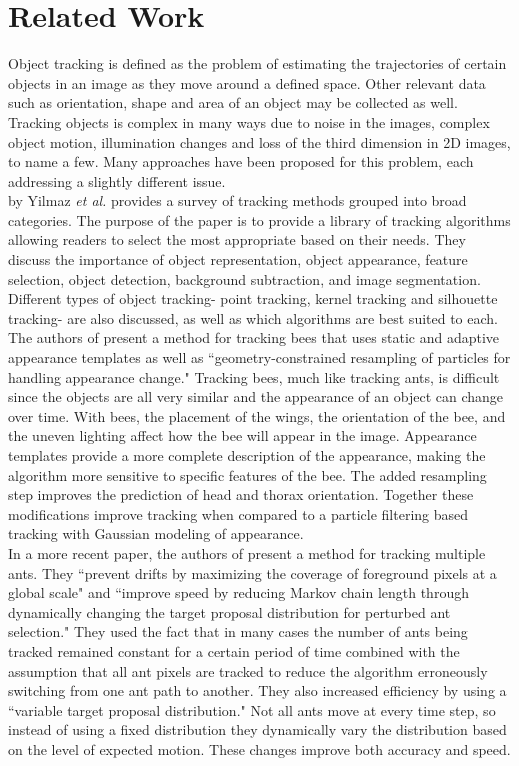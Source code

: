 \documentclass[12pt]{article}
\begin{document}
\section{Related Work}
Object tracking is defined as the problem of estimating the trajectories of certain objects in an image as they move around a defined space. Other relevant data such as orientation, shape and area of an object may be collected as well. Tracking objects is complex in many ways due to noise in the images, complex object motion, illumination changes and loss of the third dimension in 2D images, to name a few. Many approaches have been proposed for this problem, each addressing a slightly different issue.\\
\indent  \cite{Yilmaz06}  by Yilmaz {\it et al.} provides a survey of tracking methods grouped into broad categories. The purpose of the paper is to provide a library of tracking algorithms allowing readers to select the most appropriate based on their needs. They discuss the importance of object representation, object appearance, feature selection, object detection, background subtraction, and image segmentation. Different types of object tracking- point tracking, kernel tracking and silhouette tracking- are also discussed, as well as which algorithms are best suited to each. \\
\indent The authors of \cite{Maitra09} present a method for tracking bees that uses static and adaptive appearance templates as well as ``geometry-constrained resampling of particles for handling appearance change." Tracking bees, much like tracking ants, is difficult since the objects are all very similar and the appearance of an object can change over time. With bees, the placement of the wings, the orientation of the bee, and the uneven lighting affect how the bee will appear in the image. Appearance templates provide a more complete description of the appearance, making the algorithm more sensitive to specific features of the bee. The added resampling step improves the prediction of head and thorax orientation. Together these modifications improve tracking when compared to a particle filtering based tracking with Gaussian modeling of appearance.\\
\indent In a more recent paper, the authors of \cite{Fletcher11} present a method for tracking multiple ants. They ``prevent drifts by maximizing the coverage of foreground pixels at a global scale" and ``improve speed by reducing Markov chain length through dynamically changing the target proposal distribution for perturbed ant selection." They used the fact that in many cases the number of ants being tracked remained constant for a certain period of time combined with the assumption that all ant pixels are tracked to reduce the algorithm erroneously switching from one ant path to another. They also increased efficiency by using a ``variable target proposal distribution." Not all ants move at every time step, so instead of using a fixed distribution they dynamically vary the distribution based on the level of expected motion. These changes improve both accuracy and speed.\\
\end{document}
